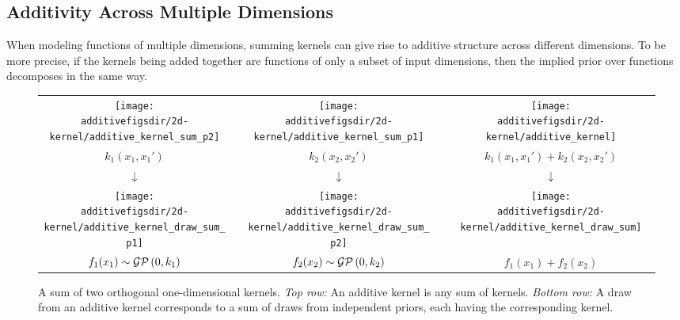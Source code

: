 \subsection{Additivity Across Multiple Dimensions}
\label{sec:additivity-multiple-dimensions}

When modeling functions of multiple dimensions, summing kernels can give rise to additive structure across different dimensions.
To be more precise, if the kernels being added together are functions of only a subset of input dimensions, then the implied prior over functions decomposes in the same way.
%
\begin{figure}
\centering
\begin{tabular}{ccccc}
\hspace{-0.2cm}\texttt{[image: \\additivefigsdir/2d-kernel/additive\_kernel\_sum\_p2]} 
& \hspace{-0.4cm} \raisebox{1cm}{+} \hspace{-0.4cm} & 
\texttt{[image: \\additivefigsdir/2d-kernel/additive\_kernel\_sum\_p1]} 
& \hspace{-0.4cm} \raisebox{1cm}{=} \hspace{-0.4cm} & 
\texttt{[image: \\additivefigsdir/2d-kernel/additive\_kernel]} \\
$k_1(x_1, x_1')$ & & $k_2(x_2, x_2')$ & & $k_1(x_1,x_1') + k_2(x_2,x_2')$ \\[1em]
\large $\downarrow$ & & \large $\downarrow$ & & \large $\downarrow$ \\[-0.2em]
\hspace{-0.2cm}\texttt{[image: \\additivefigsdir/2d-kernel/additive\_kernel\_draw\_sum\_p1]}
& \hspace{-0.4cm} \raisebox{1cm}{+} \hspace{-0.4cm} & 
\texttt{[image: \\additivefigsdir/2d-kernel/additive\_kernel\_draw\_sum\_p2]}
& \hspace{-0.4cm} \raisebox{1cm}{=} \hspace{-0.4cm} &
\texttt{[image: \\additivefigsdir/2d-kernel/additive\_kernel\_draw\_sum]} \\
$f_1(x_1) \sim \mathcal{GP}\left(0, k_1\right)$ & & $f_2(x_2) \sim \mathcal{GP}\left(0, k_2\right)$ & & $f_1(x_1) + f_2(x_2)$ \\[1em]
\end{tabular}
\caption[Additive kernels correspond to additive functions]{
A sum of two orthogonal one-dimensional kernels.
\emph{Top row:} An additive kernel is any sum of kernels.
\emph{Bottom row:} A draw from an additive kernel corresponds to a sum of draws from independent \gp{} priors, each having the corresponding kernel.
}
\label{fig:sum-of-kernels}
\end{figure}
